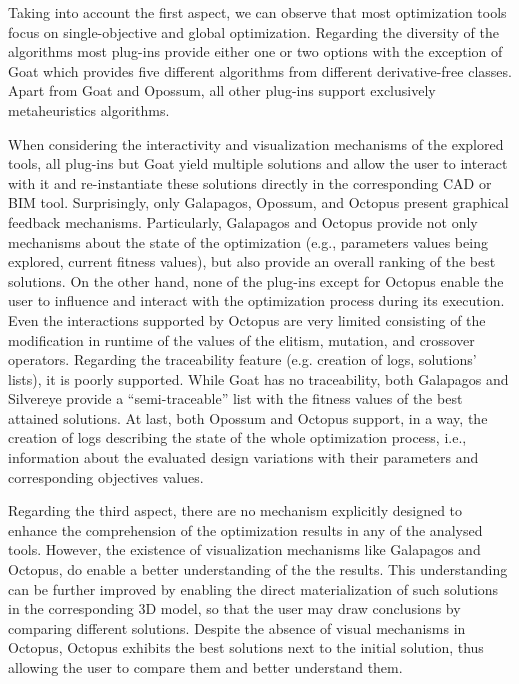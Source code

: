 	Taking into account the first aspect, we can observe that most optimization tools focus on single-objective and global optimization. Regarding the diversity of the algorithms most plug-ins provide either one or two options with the exception of Goat which provides five different algorithms from different derivative-free classes. Apart from Goat and Opossum, all other plug-ins support exclusively metaheuristics algorithms.
	
	When considering the interactivity and visualization mechanisms of the explored tools, all plug-ins but Goat yield multiple solutions and allow the user to interact with it and re-instantiate these solutions directly in the corresponding \ac{CAD} or \ac{BIM} tool. Surprisingly, only Galapagos, Opossum, and Octopus present graphical feedback mechanisms. Particularly, Galapagos and Octopus provide not only mechanisms about the state of the optimization (e.g., parameters values being explored, current fitness values), but also provide an overall ranking of the best solutions. On the other hand, none of the plug-ins except for Octopus enable the user to influence and interact with the optimization process during its execution. Even the interactions supported by Octopus are very limited consisting of the modification in runtime of the values of the elitism, mutation, and crossover operators. Regarding the traceability feature (e.g. creation of logs, solutions' lists), it is poorly supported. While Goat has no traceability, both Galapagos and Silvereye provide a ``semi-traceable'' list with the fitness values of the best attained solutions. At last, both Opossum and Octopus support, in a way, the creation of logs describing the state of the whole optimization process, i.e., information about the evaluated design variations with their parameters and corresponding objectives values.
	
	Regarding the third aspect, there are no mechanism explicitly designed to enhance the comprehension of the optimization results in any of the analysed tools. However, the existence of visualization mechanisms like Galapagos and Octopus, do enable a better understanding of the the results. This understanding can be further improved by enabling the direct materialization of such solutions in the corresponding 3D model, so that the user may draw conclusions by comparing different solutions. Despite the absence of visual mechanisms in Octopus, Octopus exhibits the best solutions next to the initial solution, thus allowing the user to compare them and better understand them.
	

